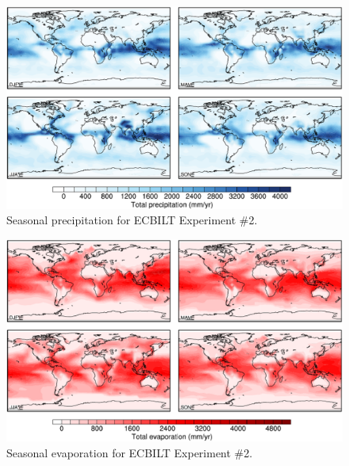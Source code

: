 \documentclass[a4paper,11pt]{article}
\begin{document}
\begin{figure}
  \begin{center}
    \includegraphics[width=\textwidth]{../expt-2/plots/pp-plots}
  \end{center}
  \caption{Seasonal precipitation for ECBILT Experiment \#2.}
  \label{fig:pp-2}
\end{figure}

\begin{figure}
  \begin{center}
    \includegraphics[width=\textwidth]{../expt-2/plots/evap-plots}
  \end{center}
  \caption{Seasonal evaporation for ECBILT Experiment \#2.}
  \label{fig:evap-2}
\end{figure}
\end{document}
